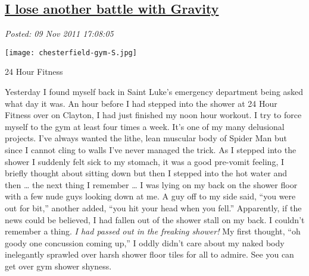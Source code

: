 %

\subsection*{\href{https://bakerjd99.wordpress.com/2011/11/09/i-lose-another-battle-with-gravity/}{I lose another battle with Gravity}}


\noindent\emph{Posted: 09 Nov 2011 17:08:05}
\vspace{6pt}


\captionsetup[floatingfigure]{labelformat=empty}
\begin{floatingfigure}[l]{0.30\textwidth}
\centering
{\texttt{[image: chesterfield-gym-S.jpg]}}
\caption{24 Hour  Fitness}
\label{fig:2045X0}
\end{floatingfigure}Yesterday I found myself back in Saint Luke's emergency department being
asked what day it was. An hour before I had stepped into the shower at
24 Hour Fitness over on Clayton, I had just finished my noon hour
workout. I try to force myself to the gym at least four times a week.
It's one of my many delusional projects. I've always wanted the lithe,
lean muscular body of Spider Man but since I cannot cling to walls I've
never managed the trick. As I stepped into the shower I suddenly felt
sick to my stomach, it was a good pre-vomit feeling, I briefly thought
about sitting down but then I stepped into the hot water and then
\ldots{} the next thing I remember \ldots{} I was lying on my back on
the shower floor with a few nude guys looking down at me. A guy off to
my side said, ``you were out for bit,'' another added, ``you hit your
head when you fell.'' Apparently, if the news could be believed, I had
fallen out of the shower stall on my back. I couldn't remember a thing.
\emph{I had passed out in the freaking shower!} My first thought, ``oh
goody one concussion coming up,'' I oddly didn't care about my naked
body inelegantly sprawled over harsh shower floor tiles for all to
admire. See you can get over gym shower shyness.

